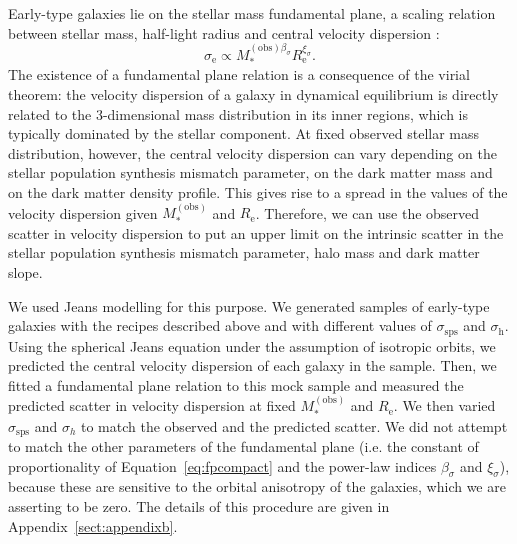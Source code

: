 \documentclass{aa}
\def\reff{R_{\mathrm{e}}}
\def\mstar{M_*}
\def\mobs{M_*^{(\mathrm{obs})}}
\def\Eref#1{Equation~\ref{#1}\xspace}
\begin{document}
Early-type galaxies lie on the stellar mass fundamental plane, a scaling relation between stellar mass, half-light radius and central velocity dispersion \citep{H+B09,deG++21}:
\begin{equation}\label{eq:fpcompact}
\sigma_{\mathrm{e}} \propto \mstar^{(\mathrm{obs})\beta_{\sigma}}\reff^{\xi_{\sigma}}.
\end{equation}
The existence of a fundamental plane relation is a consequence of the virial theorem: the velocity dispersion of a galaxy in dynamical equilibrium is directly related to the 3-dimensional mass distribution in its inner regions, which is typically dominated by the stellar component.
At fixed observed stellar mass distribution, however, the central velocity dispersion can vary depending on the stellar population synthesis mismatch parameter, on the dark matter mass and on the dark matter density profile. This gives rise to a spread in the values of the velocity dispersion given $\mobs$ and $\reff$.
Therefore, we can use the observed scatter in velocity dispersion to put an upper limit on the intrinsic scatter in the stellar population synthesis mismatch parameter, halo mass and dark matter slope.

We used Jeans modelling for this purpose.
We generated samples of early-type galaxies with the recipes described above and with different values of $\sigma_{\mathrm{sps}}$ and $\sigma_\mathrm{h}$.
Using the spherical Jeans equation under the assumption of isotropic orbits, we predicted the central velocity dispersion of each galaxy in the sample. Then, we fitted a fundamental plane relation to this mock sample and measured the predicted scatter in velocity dispersion at fixed $\mobs$ and $\reff$.
We then varied $\sigma_{\mathrm{sps}}$ and $\sigma_h$ to match the observed and the predicted scatter.
We did not attempt to match the other parameters of the fundamental plane (i.e. the constant of proportionality of \Eref{eq:fpcompact} and the power-law indices $\beta_{\sigma}$ and $\xi_{\sigma}$), because these are sensitive to the orbital anisotropy of the galaxies, which we are asserting to be zero.
The details of this procedure are given in Appendix~\ref{sect:appendixb}.
\end{document}
